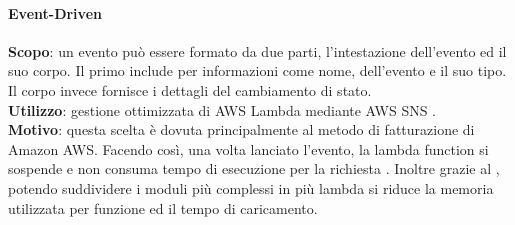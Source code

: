 \documentclass[../DefinizioneDiProdotto.tex]{subfiles}
\begin{document}
			\paragraph{Event-Driven}\mbox{}
			\begin{addmargin}[1em]{2em}%
				\textbf{Scopo}:	un evento può essere formato da due parti, l'intestazione dell'evento ed il suo corpo. Il primo include per informazioni come nome,  dell'evento e il suo tipo. Il corpo invece fornisce i dettagli del cambiamento di stato.\\
				\textbf{Utilizzo}: gestione ottimizzata di AWS Lambda mediante AWS SNS .\\
				\textbf{Motivo}: questa scelta è dovuta principalmente al metodo di fatturazione di Amazon AWS. Facendo così, una volta lanciato l'evento, la lambda function si sospende e non consuma tempo di esecuzione per la richiesta . Inoltre grazie al , potendo suddividere i moduli più complessi in più lambda si riduce la memoria utilizzata per funzione ed il tempo di caricamento.
			\end{addmargin}
\end{document}
